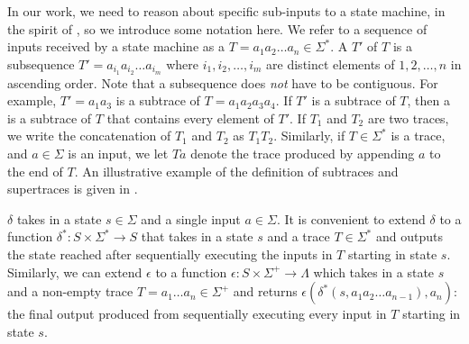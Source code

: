 In our work, we need to reason about specific sub-inputs to a state machine, in
the spirit of \whyprovenance{}, so we introduce some notation here. We refer to
a sequence of inputs received by a state machine as a  $T = a_1
a_2 \ldots a_n \in \Sigma^*$. A  $T'$ of $T$ is a subsequence
$T' = a_{i_1} a_{i_2} \ldots a_{i_m}$ where $i_1, i_2, \ldots, i_m$ are
distinct elements of $1, 2, \ldots, n$ in ascending order. Note that a
subsequence does \emph{not} have to be contiguous. For example, $T' = a_1 a_3$
is a subtrace of $T = a_1 a_2 a_3 a_4$. If $T'$ is a subtrace of $T$, then a
 is a subtrace of $T$ that contains every
element of $T'$. If $T_1$ and $T_2$ are two traces, we write the concatenation
of $T_1$ and $T_2$ as $T_1T_2$. Similarly, if $T \in \Sigma^*$ is a trace, and
$a \in \Sigma$ is an input, we let $Ta$ denote the trace produced by appending
$a$ to the end of $T$. An illustrative example of the definition of subtraces
and supertraces is given in .

{}

$\delta$ takes in a state $s \in \Sigma$ and a single input $a \in \Sigma$.
It is convenient to extend $\delta$ to a function $\delta^*: S \times \Sigma^*
\to S$ that takes in a state $s$ and a trace $T \in \Sigma^*$ and outputs the
state reached after sequentially executing the inputs in $T$ starting in state
$s$. Similarly, we can extend $\epsilon$ to a function $\epsilon: S \times
\Sigma^+ \to \Lambda$ which takes in a state $s$ and a non-empty trace $T = a_1
\ldots a_n \in \Sigma^+$ and returns $\epsilon(\delta^*(s, a_1 a_2 \ldots
a_{n-1}), a_n)$: the final output produced from sequentially executing every
input in $T$ starting in state $s$.
